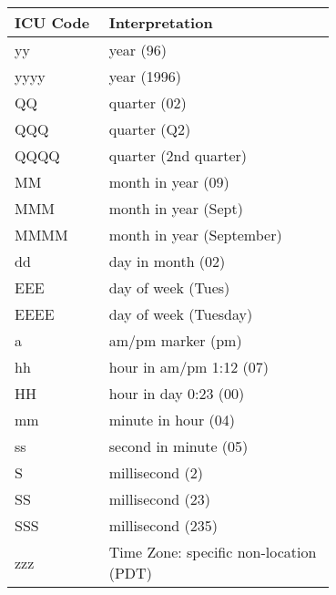 \begin{table}[ht]
\centering
\bgroup
\def\arraystretch{1.5}
\begin{tabular}{|p{0.2\linewidth}| p{0.5\linewidth}|}
\hline
\textbf{ICU Code} & \textbf{Interpretation}\\ \hline

\scriptsize{yy} & \scriptsize{year (96)}\\ \hline
\scriptsize{yyyy} & \scriptsize{year (1996)}\\ \hline
    
\scriptsize{QQ} & \scriptsize{quarter (02)}\\ \hline
\scriptsize{QQQ} & \scriptsize{quarter (Q2)}\\ \hline
\scriptsize{QQQQ} & \scriptsize{quarter (2nd quarter)}\\ \hline
    
\scriptsize{MM} & \scriptsize{month in year (09)}\\ \hline
\scriptsize{MMM} & \scriptsize{month in year (Sept)}\\ \hline
\scriptsize{MMMM} & \scriptsize{month in year (September)}\\ \hline
    
\scriptsize{dd} & \scriptsize{day in month (02)}\\ \hline
    
\scriptsize{EEE} & \scriptsize{day of week (Tues)}\\ \hline
\scriptsize{EEEE} & \scriptsize{day of week (Tuesday)}\\ \hline
    
\scriptsize{a} & \scriptsize{am/pm marker (pm)}\\ \hline
    
\scriptsize{hh} & \scriptsize{hour in am/pm 1:12 (07)}\\ \hline
\scriptsize{HH} & \scriptsize{hour in day 0:23 (00)}\\ \hline
\scriptsize{mm} & \scriptsize{minute in hour (04)}\\ \hline
\scriptsize{ss} & \scriptsize{second in minute (05)}\\ \hline
    
\scriptsize{S} & \scriptsize{millisecond (2)}\\ \hline
\scriptsize{SS} & \scriptsize{millisecond (23)}\\ \hline
\scriptsize{SSS} & \scriptsize{millisecond (235)}\\ \hline

\scriptsize{zzz} & \scriptsize{Time Zone: specific non-location (PDT)}\\ \hline


\end{tabular}
\end{table}
